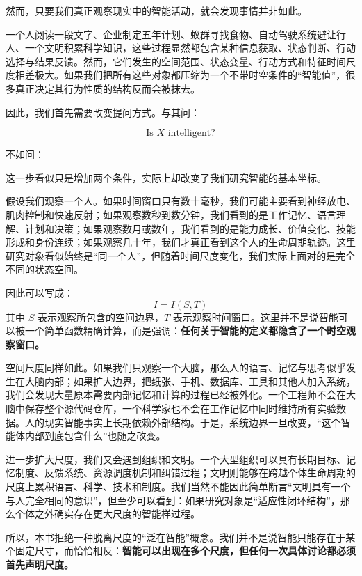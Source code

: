 然而，只要我们真正观察现实中的智能活动，就会发现事情并非如此。

一个人阅读一段文字、企业制定五年计划、蚁群寻找食物、自动驾驶系统避让行人、一个文明积累科学知识，这些过程显然都包含某种信息获取、状态判断、行动选择与结果反馈。然而，它们发生的空间范围、状态变量、行动方式和特征时间尺度相差极大。如果我们把所有这些对象都压缩为一个不带时空条件的“智能值”，很多真正决定其行为性质的结构反而会被抹去。

因此，我们首先需要改变提问方式。与其问：

\[
\text{Is } X \text{ intelligent?}
\]

不如问：

\begin{statementbox}
\centering
{}
\end{statementbox}

这一步看似只是增加两个条件，实际上却改变了我们研究智能的基本坐标。

假设我们观察一个人。如果时间窗口只有数十毫秒，我们可能主要看到神经放电、肌肉控制和快速反射；如果观察数秒到数分钟，我们看到的是工作记忆、语言理解、计划和决策；如果观察数月或数年，我们看到的是能力成长、价值变化、技能形成和身份连续；如果观察几十年，我们才真正看到这个人的生命周期轨迹。这里研究对象看似始终是“同一个人”，但随着时间尺度变化，我们实际上面对的是完全不同的状态空间。

因此可以写成：
\[
\boxed{
I = I(S,T)
}
\]
其中 \(S\) 表示观察所包含的空间边界，\(T\) 表示观察时间窗口。这里并不是说智能可以被一个简单函数精确计算，而是强调：\textbf{任何关于智能的定义都隐含了一个时空观察窗口。}

空间尺度同样如此。如果我们只观察一个大脑，那么人的语言、记忆与思考似乎发生在大脑内部；如果扩大边界，把纸张、手机、数据库、工具和其他人加入系统，我们会发现大量原本需要内部记忆和计算的过程已经被外化。一个工程师不会在大脑中保存整个源代码仓库，一个科学家也不会在工作记忆中同时维持所有实验数据。人的现实智能事实上长期依赖外部结构。于是，系统边界一旦改变，“这个智能体内部到底包含什么”也随之改变。

进一步扩大尺度，我们又会遇到组织和文明。一个大型组织可以具有长期目标、记忆制度、反馈系统、资源调度机制和纠错过程；文明则能够在跨越个体生命周期的尺度上累积语言、科学、技术和制度。我们当然不能因此简单断言“文明具有一个与人完全相同的意识”，但至少可以看到：如果研究对象是“适应性闭环结构”，那么个体之外确实存在更大尺度的智能样过程。

所以，本书拒绝一种脱离尺度的“泛在智能”概念。我们并不是说智能只能存在于某个固定尺寸，而恰恰相反：\textbf{智能可以出现在多个尺度，但任何一次具体讨论都必须首先声明尺度。}

